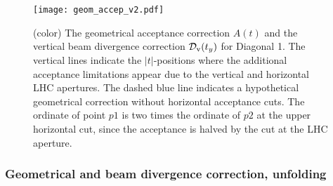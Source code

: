 \documentclass[TOTEM]{cernphprep}
\begin{document}
	\begin{figure}[H]
		\centering
		\texttt{[image: geom\_accep\_v2.pdf]}
		\caption{(color) The geometrical acceptance correction $A(t)$ and the vertical beam divergence correction $\mathcal{D}_{\rm v}(t_{y})$ for Diagonal 1. The vertical lines indicate the $|t|$-positions where the additional acceptance limitations appear due to the
		 vertical and horizontal LHC apertures. The dashed blue line indicates a hypothetical geometrical correction without horizontal acceptance cuts. The ordinate of point $p1$ is two times the ordinate of $p2$
		at the upper horizontal cut, since the acceptance is halved by the cut at the LHC aperture.}
		\label{geometrical_acceptance_correction}
	\end{figure}


	\subsubsection{Geometrical and beam divergence correction, unfolding}
\end{document}
